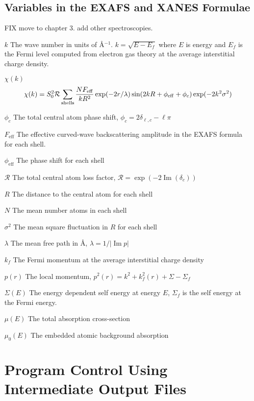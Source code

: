 \documentclass[11pt,oneside]{report} %
\renewcommand{\Im}{\operatorname{Im}}
\begin{document}
\begin{latexonly}
\subsection{Variables in the EXAFS and XANES Formulae}
\label{sec:Vari-EXAFS-form}
FIX move to chapter 3. add other spectroscopies.
\begin{Reflist}
\item[$k$] The wave number in units of \AA$^{-1}$.
  $k=\sqrt{E-E_f}$ where $E$ is energy and $E_f$ is the Fermi level
  computed from electron gas theory at the average interstitial charge
  density.
\item[$\chi(k)$]
  $$ \chi(k) = S_0^2  \mathcal{R}  \sum\limits_{\mathrm{shells}}
  \frac{NF_\mathrm{eff}}{kR^2} \exp(-2r/\lambda)
  \sin(2kR + \phi_{\mathrm{eff}} + \phi_c)
  \exp(-2k^2\sigma^2) \notag $$
\item[$\phi_c$]
  The total central atom phase shift, $\phi_c=2\delta_{\ell,c} - \ell\pi$
\item[$F_{\mathrm{eff}}$]
  The effective curved-wave backscattering amplitude in the EXAFS
  formula for each shell.
\item[$\phi_{\mathrm{eff}}$]
  The phase shift for each shell
\item[$\mathcal{R}$]
  The total central atom loss factor, $\mathcal{R}=\exp(-2\Im(\delta_c))$
\item[$R$]
  The distance to the central atom for each shell
\item[$N$]
  The mean number atoms in each shell
\item[$\sigma^2$]
  The mean square fluctuation in $R$ for each shell
\item[$\lambda$]
  The mean free path in \AA, $\lambda = {1/ |\Im p |}$
\item[$k_f$]
  The Fermi momentum at the average interstitial charge density
\item[$p(r)$]
  The local momentum, $p^2(r)=k^2+k_f^2(r)+\Sigma-\Sigma_f$
\item[$\Sigma(E)$]
  The energy dependent self energy at energy $E$, $\Sigma_f$ is the self
  energy at the Fermi energy.
\item[$\mu(E)$]
  The total absorption cross-section
\item[$\mu_0(E)$]
  The embedded atomic background absorption
\end{Reflist}



\section{Program Control Using Intermediate Output Files}
\label{sec:Addit-progr-contr}


\end{latexonly}
\end{document}
